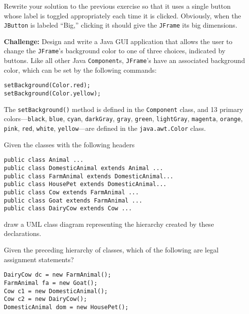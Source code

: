 \begin{EXRtwo}
\item  Rewrite your solution to the previous exercise
so that it uses a single button whose label is toggled appropriately
each time it is clicked.  Obviously, when the {\tt JButton} is
labeled ``Big,'' clicking it should give the {\tt JFrame} its big
dimensions.


\item  {\bf Challenge:} Design and write a Java GUI application that allows 
the user to change the {\tt JFrame}'s background color to one of three choices,
indicated by buttons.  Like all other Java {\tt Component}s, {\tt JFrame}'s
have an associated background color, which can be set by the following
commands:

\begin{jjjlisting}
\begin{lstlisting}
setBackground(Color.red);
setBackground(Color.yellow);
\end{lstlisting}
\end{jjjlisting}

\noindent The {\tt setBackground()} method is defined in the
{\tt Component} class, and 13 primary colors---{\tt black}, {\tt blue},
{\tt cyan}, {\tt darkGray}, {\tt gray}, {\tt green}, {\tt lightGray}, 
\mbox{\tt magenta}, {\tt orange}, {\tt pink}, {\tt red}, {\tt white}, {\tt yellow}---are 
defined in the {\tt java.awt.Color} class.


\item Given the classes with the following headers
\begin{jjjlisting}
\begin{lstlisting}
public class Animal ...
public class DomesticAnimal extends Animal ...
public class FarmAnimal extends DomesticAnimal...
public class HousePet extends DomesticAnimal...
public class Cow extends FarmAnimal ...
public class Goat extends FarmAnimal ...
public class DairyCow extends Cow ...
\end{lstlisting}
\end{jjjlisting}

\noindent draw a UML class diagram representing the hierarchy
created by these \mbox{declarations.}

\item Given the preceding hierarchy of classes, which of the following
are legal assignment statements?

\begin{jjjlisting}
\begin{lstlisting}
DairyCow dc = new FarmAnimal();
FarmAnimal fa = new Goat();
Cow c1 = new DomesticAnimal();
Cow c2 = new DairyCow();
DomesticAnimal dom = new HousePet();
\end{lstlisting}
\end{jjjlisting}

\end{EXRtwo}
%














